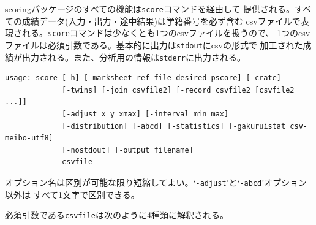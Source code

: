 scoringパッケージのすべての機能は\texttt{score}コマンドを経由して
提供される。すべての成績データ(入力・出力・途中結果)は学籍番号を必ず含む
csvファイルで表現される。\texttt{score}コマンドは少なくとも1つのcsvファイルを扱うので、
1つのcsvファイルは必須引数である。基本的に出力は\texttt{stdout}にcsvの形式で
加工された成績が出力される。また、分析用の情報は\texttt{stderr}に出力される。
\begin{tcolorbox}[enhanced jigsaw,breakable,colframe=\mycolor ,colback=white,colbacktitle=\mycolor ,coltitle=white,fonttitle=\bfseries\sffamily,title=\texttt{\$ score -h}]

\begin{verbatim}
usage: score [-h] [-marksheet ref-file desired_pscore] [-crate]
             [-twins] [-join csvfile2] [-record csvfile2 [csvfile2 ...]]
             [-adjust x y xmax] [-interval min max]
             [-distribution] [-abcd] [-statistics] [-gakuruistat csv-meibo-utf8]
             [-nostdout] [-output filename]
             csvfile
\end{verbatim}

\end{tcolorbox}

オプション名は区別が可能な限り短縮してよい。`\texttt{-adjust}'と`\texttt{-abcd}'オプション以外は
すべて1文字で区別できる。

必須引数である\texttt{csvfile}は次のように4種類に解釈される。

